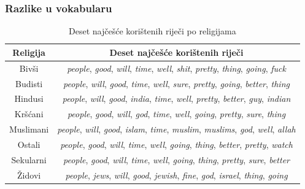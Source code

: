 \documentclass{beamer}
\begin{document}
\begin{frame}
\frametitle{Razlike u vokabularu}
\begin{table}[h!]
\small
\centering
\caption{Deset najčešće korištenih riječi po religijama}
\label{table:voc}
\begin{tabular}{@{}cc@{}}
\hline
Religija  & Deset najčešće korištenih riječi                                       \\
\hline
\hline
Bivši     & \emph{people}, \emph{good}, \emph{will}, \emph{time}, \emph{well}, \emph{shit}, \emph{pretty}, \emph{thing}, \emph{going}, \emph{fuck}    \\
Budisti   & \emph{people}, \emph{will}, \emph{good}, \emph{time}, \emph{well}, \emph{sure}, \emph{pretty}, \emph{going}, \emph{better}, \emph{thing}  \\
Hindusi   & \emph{people}, \emph{will}, \emph{good}, \emph{india}, \emph{time}, \emph{well}, \emph{pretty}, \emph{better}, \emph{guy}, \emph{indian} \\
Kršćani   & \emph{people}, \emph{good}, \emph{will}, \emph{god}, \emph{time}, \emph{well}, \emph{going}, \emph{pretty}, \emph{sure}, \emph{thing}     \\
Muslimani & \emph{people}, \emph{will}, \emph{good}, \emph{islam}, \emph{time}, \emph{muslim}, \emph{muslims}, \emph{god}, \emph{well}, \emph{allah}  \\
Ostali    & \emph{people}, \emph{good}, \emph{will}, \emph{time}, \emph{well}, \emph{going}, \emph{thing}, \emph{better}, \emph{pretty}, \emph{watch} \\
Sekularni & \emph{people}, \emph{good}, \emph{will}, \emph{time}, \emph{well}, \emph{going}, \emph{thing}, \emph{pretty}, \emph{sure}, \emph{better}  \\
Židovi    & \emph{people}, \emph{jews}, \emph{will}, \emph{good}, \emph{jewish}, \emph{fine}, \emph{god}, \emph{israel}, \emph{thing}, \emph{going}   \\

\hline
\end{tabular}
\end{table}

\end{frame}
\end{document}
